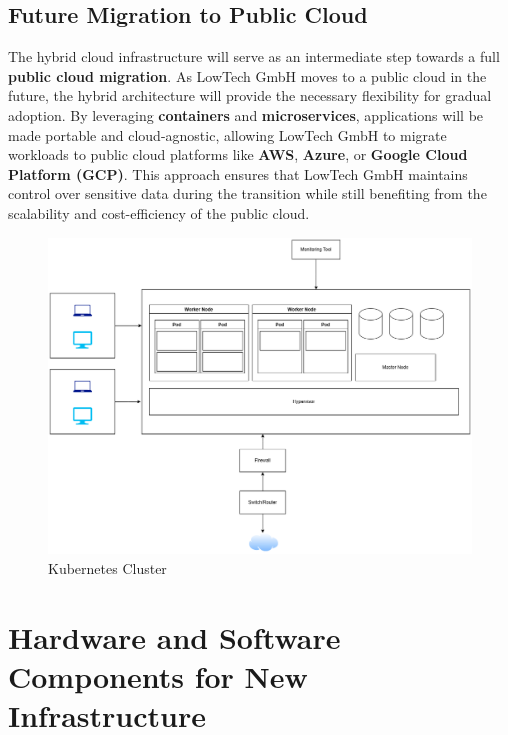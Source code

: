 \subsection{Future Migration to Public Cloud}

The hybrid cloud infrastructure will serve as an intermediate step towards a full \textbf{public cloud migration}. As LowTech GmbH moves to a public cloud in the future, the hybrid architecture will provide the necessary flexibility for gradual adoption. By leveraging \textbf{containers} and \textbf{microservices}, applications will be made portable and cloud-agnostic, allowing LowTech GmbH to migrate workloads to public cloud platforms like \textbf{AWS}, \textbf{Azure}, or \textbf{Google Cloud Platform (GCP)}. This approach ensures that LowTech GmbH maintains control over sensitive data during the transition while still benefiting from the scalability and cost-efficiency of the public cloud.




\begin{figure}[H]
\centering
\includegraphics[width=1\textwidth]{Images/K8_cluster} 
\caption{Kubernetes Cluster}
\label{fig:vite}
\end{figure}


\section{Hardware and Software Components for New Infrastructure}

